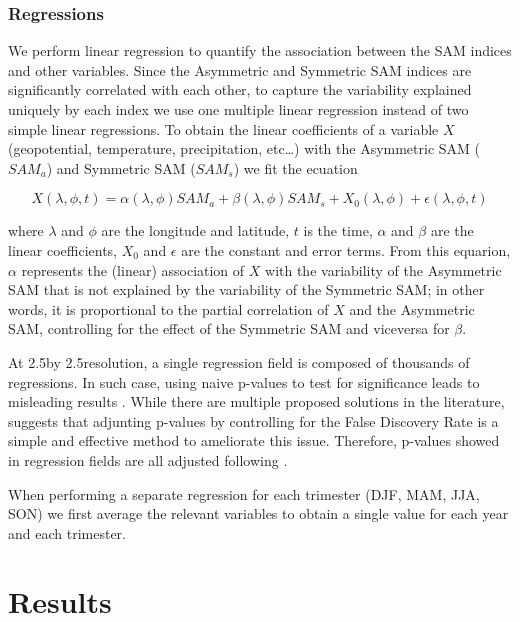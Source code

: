 \documentclass[]{ametsocV5}
\begin{document}
\subsubsection{Regressions}

We perform linear regression to quantify the association between the SAM
indices and other variables. Since the Asymmetric and Symmetric SAM
indices are significantly correlated with each other, to capture the
variability explained uniquely by each index we use one multiple linear
regression instead of two simple linear regressions. To obtain the
linear coefficients of a variable \(X\) (geopotential, temperature,
precipitation, etc\ldots{}) with the Asymmetric SAM (\(SAM_a\)) and
Symmetric SAM (\(SAM_s\)) we fit the ecuation

\[
X(\lambda, \phi, t) = \alpha(\lambda, \phi) SAM_a + \beta(\lambda, \phi) SAM_s + X_0(\lambda, \phi) +  \epsilon(\lambda, \phi, t)
\]

where \(\lambda\) and \(\phi\) are the longitude and latitude, \(t\) is
the time, \(\alpha\) and \(\beta\) are the linear coefficients, \(X_0\)
and \(\epsilon\) are the constant and error terms. From this equarion,
\(\alpha\) represents the (linear) association of \(X\) with the
variability of the Asymmetric SAM that is not explained by the
variability of the Symmetric SAM; in other words, it is proportional to
the partial correlation of \(X\) and the Asymmetric SAM, controlling for
the effect of the Symmetric SAM and viceversa for \(\beta\).

At 2.5\degree by 2.5\degree resolution, a single regression field is
composed of thousands of regressions. In such case, using naive p-values
to test for significance leads to misleading results
\citep{walker1914, katz1991}. While there are multiple proposed
solutions in the literature, \citet{wilks2016} suggests that adjunting
p-values by controlling for the False Discovery Rate
\citep{benjamini1995} is a simple and effective method to ameliorate
this issue. Therefore, p-values showed in regression fields are all
adjusted following \citet{benjamini1995}.

When performing a separate regression for each trimester (DJF, MAM, JJA,
SON) we first average the relevant variables to obtain a single value
for each year and each trimester.

\section{Results}
\end{document}
